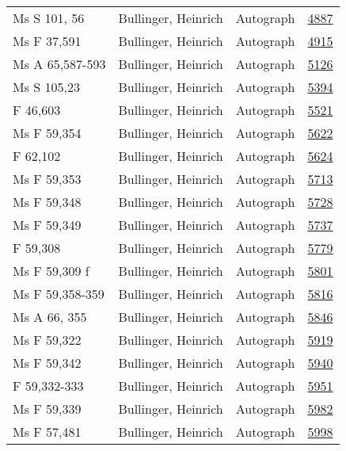 \documentclass[10pt,a4paper,landscape]{report}
\begin{document}
\begin{longtable}{p{16cm}p{4cm}lr}
Ms S 101, 56	&	Bullinger, Heinrich	&	Autograph	&	\href{http://130.60.24.72/assignment/4887}{4887}\\
Ms F 37,591	&	Bullinger, Heinrich	&	Autograph	&	\href{http://130.60.24.72/assignment/4915}{4915}\\
Ms A 65,587-593	&	Bullinger, Heinrich	&	Autograph	&	\href{http://130.60.24.72/assignment/5126}{5126}\\
Ms S 105,23	&	Bullinger, Heinrich	&	Autograph	&	\href{http://130.60.24.72/assignment/5394}{5394}\\
F 46,603	&	Bullinger, Heinrich	&	Autograph	&	\href{http://130.60.24.72/assignment/5521}{5521}\\
Ms F 59,354	&	Bullinger, Heinrich	&	Autograph	&	\href{http://130.60.24.72/assignment/5622}{5622}\\
F 62,102	&	Bullinger, Heinrich	&	Autograph	&	\href{http://130.60.24.72/assignment/5624}{5624}\\
Ms F 59,353	&	Bullinger, Heinrich	&	Autograph	&	\href{http://130.60.24.72/assignment/5713}{5713}\\
Ms F 59,348	&	Bullinger, Heinrich	&	Autograph	&	\href{http://130.60.24.72/assignment/5728}{5728}\\
Ms F 59,349	&	Bullinger, Heinrich	&	Autograph	&	\href{http://130.60.24.72/assignment/5737}{5737}\\
F 59,308	&	Bullinger, Heinrich	&	Autograph	&	\href{http://130.60.24.72/assignment/5779}{5779}\\
Ms F 59,309 f	&	Bullinger, Heinrich	&	Autograph	&	\href{http://130.60.24.72/assignment/5801}{5801}\\
Ms F 59,358-359	&	Bullinger, Heinrich	&	Autograph	&	\href{http://130.60.24.72/assignment/5816}{5816}\\
Ms A 66, 355	&	Bullinger, Heinrich	&	Autograph	&	\href{http://130.60.24.72/assignment/5846}{5846}\\
Ms F 59,322	&	Bullinger, Heinrich	&	Autograph	&	\href{http://130.60.24.72/assignment/5919}{5919}\\
Ms F 59,342	&	Bullinger, Heinrich	&	Autograph	&	\href{http://130.60.24.72/assignment/5940}{5940}\\
F 59,332-333	&	Bullinger, Heinrich	&	Autograph	&	\href{http://130.60.24.72/assignment/5951}{5951}\\
Ms F 59,339	&	Bullinger, Heinrich	&	Autograph	&	\href{http://130.60.24.72/assignment/5982}{5982}\\
Ms F 57,481	&	Bullinger, Heinrich	&	Autograph	&	\href{http://130.60.24.72/assignment/5998}{5998}\\

\end{longtable}
\end{document}
